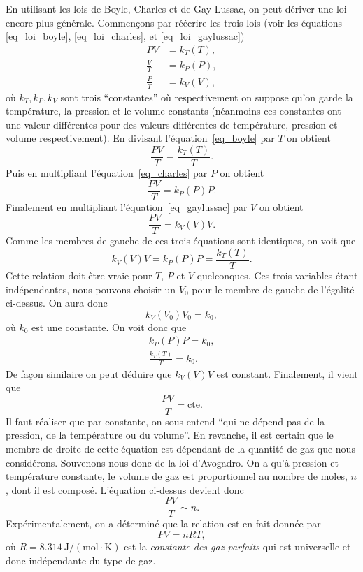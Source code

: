 \documentclass[a4paper,12pt]{book}
\newcommand{\mol}{\mathrm{mol}}
\newcommand{\K}{\mathrm{K}}
\newcommand{\J}{\mathrm{J}}
\begin{document}
En utilisant les lois de Boyle, Charles et de Gay-Lussac, on peut dériver une loi encore plus générale.
Commençons par réécrire les trois lois (voir les équations \eqref{eq_loi_boyle}, \eqref{eq_loi_charles}, et \eqref{eq_loi_gaylussac})
\begin{align}
PV&=k_T(T),\label{eq_boyle}\\
\frac{V}{T}&=k_P(P),\label{eq_charles}\\
\frac{P}{T}&=k_V(V)\label{eq_gaylussac},
\end{align}
où $k_T,k_P,k_V$ sont trois ``constantes'' où respectivement on suppose qu'on garde la température, 
la pression et le volume constants (néanmoins ces constantes ont une valeur différentes pour des valeurs
différentes de température, pression et volume respectivement). En divisant l'équation~\eqref{eq_boyle}
par $T$ on obtient 
\begin{equation}
\frac{PV}{T}=\frac{k_T(T)}{T}.
\end{equation}
Puis en multipliant l'équation~\eqref{eq_charles} par $P$ on obtient
\begin{equation}
\frac{PV}{T}=k_P(P)P.
\end{equation}
Finalement en multipliant l'équation~\eqref{eq_gaylussac} par $V$ on obtient
\begin{equation}
\frac{PV}{T}=k_V(V)V.
\end{equation}
Comme les membres de gauche de ces trois équations sont identiques, on voit que
\begin{equation}
k_V(V)V=k_P(P)P=\frac{k_T(T)}{T}.
\end{equation}
Cette relation doit être vraie pour $T$, $P$ et $V$ quelconques. 
Ces trois variables étant indépendantes, nous pouvons choisir 
un $V_0$ pour le membre de gauche de l'égalité ci-dessus. On aura donc
\begin{equation}
k_V(V_0)V_0=k_0,
\end{equation}
où $k_0$ est une constante. On voit donc que 
\begin{align}
k_P(P)P=k_0,\\
\frac{k_T(T)}{T}=k_0.
\end{align}
De façon similaire on peut déduire que $k_V(V)V$ est constant.
Finalement, il vient que
\begin{equation}
\frac{PV}{T}=\mbox{cte}.
\end{equation}
Il faut réaliser que par constante, on sous-entend ``qui ne dépend pas de la pression, de la température ou du volume''.
En revanche, il est certain que le membre de droite de cette équation est dépendant de la quantité de gaz
que nous considérons. Souvenons-nous donc de la loi d'Avogadro. On a qu'à pression et température constante,
le volume de gaz est proportionnel au nombre de moles, $n$, dont il est composé. L'équation ci-dessus devient donc
\begin{equation}
\frac{PV}{T}\sim n.
\end{equation}
Expérimentalement, on a déterminé que la relation est en fait donnée par
\begin{equation}
PV=nRT,
\end{equation}
où $R=8.314\ \J/(\mol\cdot\K)$ est la \textit{constante des gaz parfaits} qui est universelle et donc indépendante du type de gaz.
\end{document}
